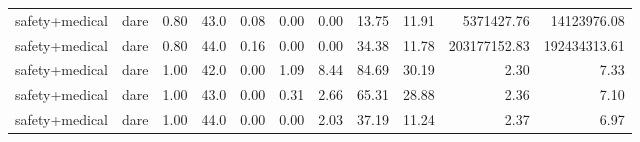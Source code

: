 \documentclass{article}
\begin{document}
\begin{table}[H]
{\begin{tabular}{llllrrrrrrr}
safety+medical & dare & 0.80 & 43.0 & 0.08 & 0.00 & 0.00 & 13.75 & 11.91 & 5371427.76 & 14123976.08 \\
safety+medical & dare & 0.80 & 44.0 & 0.16 & 0.00 & 0.00 & 34.38 & 11.78 & 203177152.83 & 192434313.61 \\
safety+medical & dare & 1.00 & 42.0 & 0.00 & 1.09 & 8.44 & 84.69 & 30.19 & 2.30 & 7.33 \\
safety+medical & dare & 1.00 & 43.0 & 0.00 & 0.31 & 2.66 & 65.31 & 28.88 & 2.36 & 7.10 \\
safety+medical & dare & 1.00 & 44.0 & 0.00 & 0.00 & 2.03 & 37.19 & 11.24 & 2.37 & 6.97 \\
\bottomrule
\end{tabular}
}
\end{table}


\end{document}

